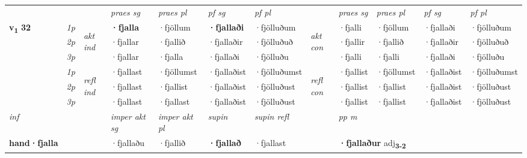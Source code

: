 \begin{longtable}[l]{X>{\footnotesize\itshape}llXXXXlXXXX}
\midrule

 & &   & \textit{praes sg}  & \textit{praes pl}    & \textit{ pf sg} & \textit{pf pl} & & \textit{praes sg}  & \textit{praes pl}    & \textit{pf sg} & \textit{pf pl }  \\ \cmidrule{4-7} \cmidrule{9-12}
 \multirow{2}{*}{{{\textbf{v{\textsubscript{1}}} \Large{\textbf{32}}}}}  & 1p & \multirow{3}{*}{\begin{turn}{90}\textit{akt ind}\end{turn}} & \textbf{·fjalla} & ·fjöllum & \textbf{·fjallaði} & ·fjölluðum & \multirow{3}{*}{\begin{turn}{90}\textit{akt con}\end{turn}} &·fjalli & ·fjöllum & ·fjallaði & ·fjölluðum\\*
 & 2p &  &  ·fjallar  & ·fjallið & ·fjallaðir & ·fjölluðuð & & ·fjallir & ·fjallið & ·fjallaðir & ·fjölluðuð \\*
 & 3p &  & ·fjallar & ·fjalla & ·fjallaði & ·fjölluðu & & ·fjalli & ·fjalli& ·fjallaði & ·fjölluðu \\*
\cmidrule{4-7} \cmidrule{9-12}
 & 1p & \multirow{3}{*}{\begin{turn}{90}\textit{refl ind}\end{turn}}  & ·fjallast & ·fjöllumst & ·fjallaðist & ·fjölluðumst & \multirow{3}{*}{\begin{turn}{90}\textit{refl con}\end{turn}}  &·fjallist & ·fjöllumst & ·fjallaðist & ·fjölluðumst \\*
 & 2p &  & ·fjallast & ·fjallist & ·fjallaðist & ·fjölluðust & &·fjallist & ·fjallist & ·fjallaðist & ·fjölluðust \\*
 & 3p  & & ·fjallast & ·fjallast & ·fjallaðist & ·fjölluðust & & ·fjallist & ·fjallist& ·fjallaðist & ·fjölluðust \\*
\cmidrule{4-7} \cmidrule{9-12}

   {\textit{inf}} & &  & \textit{imper akt sg} & \textit{imper akt pl}    & \textit{supin} & \textit{supin refl} && \textit{pp m} \\*
  {\textbf{hand\allowbreak ·fjalla}} & && ·fjallaðu  & ·fjallið    &  \textbf{·fjallað} & ·fjallast && \multicolumn{2}{l}{\textbf{·fjallaður} adj\textbf{\textsubscript{3-2}}} \\*

\midrule


\end{longtable}
